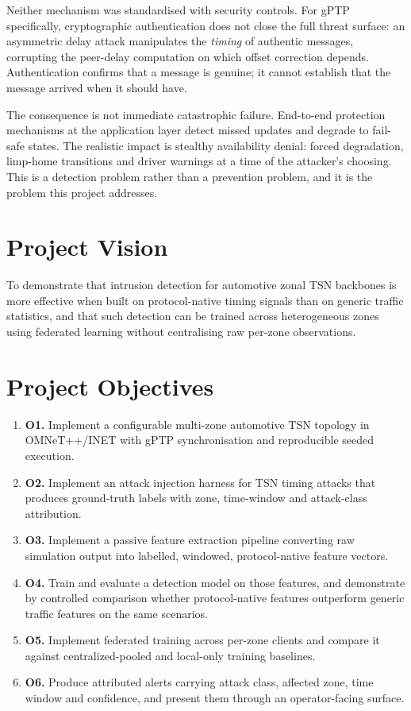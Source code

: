 Neither mechanism was standardised with security controls. For gPTP specifically,
cryptographic authentication does not close the full threat surface: an asymmetric
delay attack manipulates the \emph{timing} of authentic messages, corrupting the
peer-delay computation on which offset correction depends. Authentication confirms
that a message is genuine; it cannot establish that the message arrived when it
should have.

The consequence is not immediate catastrophic failure. End-to-end protection
mechanisms at the application layer detect missed updates and degrade to fail-safe
states. The realistic impact is stealthy availability denial: forced degradation,
limp-home transitions and driver warnings at a time of the attacker's choosing. This
is a detection problem rather than a prevention problem, and it is the problem this
project addresses.

\section{Project Vision}
To demonstrate that intrusion detection for automotive zonal TSN backbones is more
effective when built on protocol-native timing signals than on generic traffic
statistics, and that such detection can be trained across heterogeneous zones using
federated learning without centralising raw per-zone observations.

\section{Project Objectives}
\begin{enumerate}
  \item \textbf{O1.} Implement a configurable multi-zone automotive TSN topology in
        OMNeT++/INET with gPTP synchronisation and reproducible seeded execution.
  \item \textbf{O2.} Implement an attack injection harness for TSN timing attacks that
        produces ground-truth labels with zone, time-window and attack-class attribution.
  \item \textbf{O3.} Implement a passive feature extraction pipeline converting raw
        simulation output into labelled, windowed, protocol-native feature vectors.
  \item \textbf{O4.} Train and evaluate a detection model on those features, and
        demonstrate by controlled comparison whether protocol-native features
        outperform generic traffic features on the same scenarios.
  \item \textbf{O5.} Implement federated training across per-zone clients and compare
        it against centralized-pooled and local-only training baselines.
  \item \textbf{O6.} Produce attributed alerts carrying attack class, affected zone,
        time window and confidence, and present them through an operator-facing surface.
\end{enumerate}


